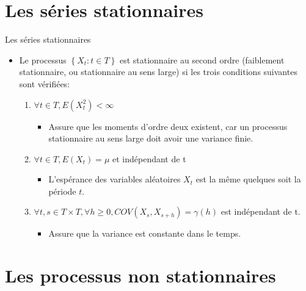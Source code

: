 \documentclass{beamer}
\begin{document}
\section{Les séries stationnaires}
\frame{\tableofcontents[current]}

\begin{frame}{Les séries stationnaires}
\begin{itemize}
\item Le processus $\left\{X_t : t \in T \right\}$ est stationnaire au second ordre (faiblement stationnaire, ou stationnaire au sens large) si les trois conditions suivantes sont vérifiées:
\begin{enumerate}
\item $\forall t \in T, E(X_t^2)< \infty$
\begin{itemize}
\item Assure que les moments d’ordre deux existent, car un processus stationnaire au sens large doit avoir une variance finie.
\end{itemize}
\item $\forall t \in T, E(X_t)=\mu$ et indépendant de t
\begin{itemize}
\item L’espérance des variables aléatoires  $X_t$ est la même quelques soit la période $t$. 
\end{itemize}
\item $\forall t,s \in T \times T, \forall h \geq 0, COV(X_s,X_{s+h})=\gamma(h)$ est indépendant de t.
\begin{itemize}
\item Assure que la variance est constante dans le temps.
\end{itemize}
\end{enumerate}
\end{itemize}
\end{frame}

\section{Les processus non stationnaires}
\frame{\tableofcontents[current]}
\end{document}

